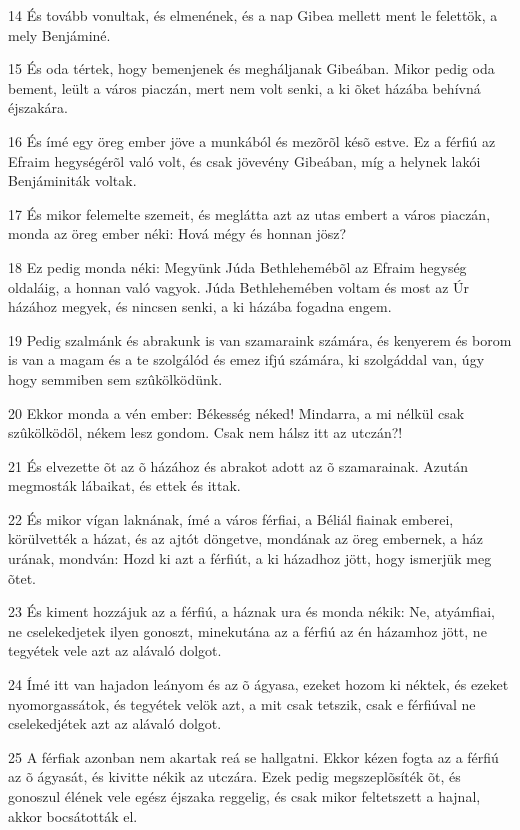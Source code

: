 \par 14 És tovább vonultak, és elmenének, és a nap Gibea mellett ment le felettök, a mely Benjáminé.
\par 15 És oda tértek, hogy bemenjenek és megháljanak Gibeában. Mikor pedig oda bement, leült a város piaczán, mert nem volt senki, a ki õket házába behívná éjszakára.
\par 16 És ímé egy öreg ember jöve a munkából és mezõrõl késõ estve. Ez a férfiú az Efraim hegységérõl való volt, és csak jövevény Gibeában, míg a helynek lakói Benjáminiták voltak.
\par 17 És mikor felemelte szemeit, és meglátta azt az utas embert a város piaczán, monda az öreg ember néki: Hová mégy és honnan jösz?
\par 18 Ez pedig monda néki: Megyünk Júda Bethlehemébõl az Efraim hegység oldaláig, a honnan való vagyok. Júda Bethlehemében voltam és most az Úr házához megyek, és nincsen senki, a ki házába fogadna engem.
\par 19 Pedig szalmánk és abrakunk is van szamaraink számára, és kenyerem és borom is van a magam és a te szolgálód és emez ifjú számára, ki szolgáddal van, úgy hogy semmiben sem szûkölködünk.
\par 20 Ekkor monda a vén ember: Békesség néked! Mindarra, a mi nélkül csak szûkölködöl, nékem lesz gondom. Csak nem hálsz itt az utczán?!
\par 21 És elvezette õt az õ házához és abrakot adott az õ szamarainak. Azután megmosták lábaikat, és ettek és ittak.
\par 22 És mikor vígan laknának, ímé a város férfiai, a Béliál fiainak emberei, körülvették a házat, és az ajtót döngetve, mondának az öreg embernek, a ház urának, mondván: Hozd ki azt a férfiút, a ki házadhoz jött, hogy ismerjük meg õtet.
\par 23 És kiment hozzájuk az a férfiú, a háznak ura és monda nékik: Ne, atyámfiai, ne cselekedjetek ilyen gonoszt, minekutána az a férfiú az én házamhoz jött, ne tegyétek vele azt az alávaló dolgot.
\par 24 Ímé itt van hajadon leányom és az õ ágyasa, ezeket hozom ki néktek, és ezeket nyomorgassátok, és tegyétek velök azt, a mit csak tetszik, csak e férfiúval ne cselekedjétek azt az alávaló dolgot.
\par 25 A férfiak azonban nem akartak reá se hallgatni. Ekkor kézen fogta az a férfiú az õ ágyasát, és kivitte nékik az utczára. Ezek pedig megszeplõsíték õt, és gonoszul élének vele egész éjszaka reggelig, és csak mikor feltetszett a hajnal, akkor bocsátották el.
